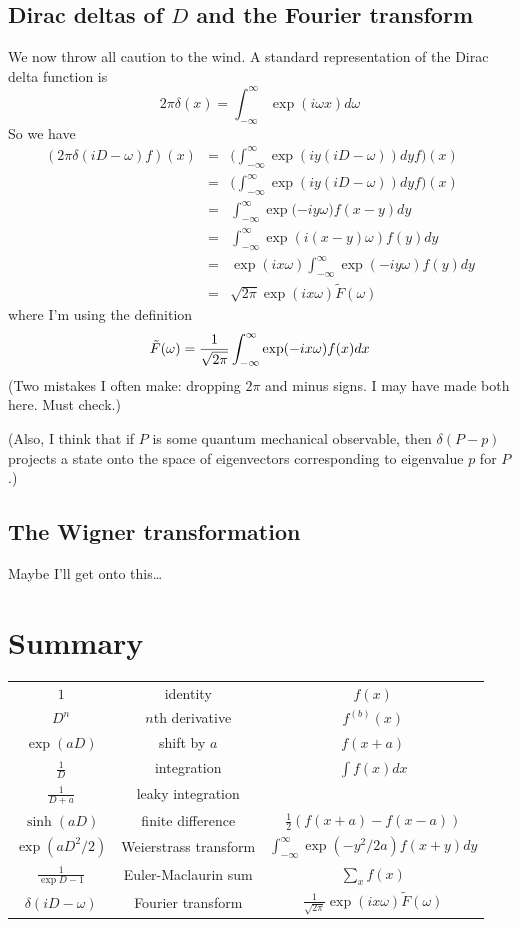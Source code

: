 \documentclass[a4paper]{article}
\theoremstyle{definition}
\begin{document}
\subsection{Dirac deltas of $D$ and the Fourier transform}
We now throw all caution to the wind.
A standard representation of the Dirac delta function is
\[
2\pi\delta(x) = \int_{-\infty}^\infty \exp(i\omega x)d\omega
\]
So we have
\begin{eqnarray*}
(2\pi\delta(iD-\omega)f)(x) & = & \big(\int_{-\infty}^\infty\exp(iy(iD-\omega))dyf\big)(x) \\
& = & \big(\int_{-\infty}^\infty\exp(iy(iD-\omega))dyf\big)(x) \\
& = & \int_{-\infty}^\infty\exp(-iy\omega\big)f(x-y)dy \\
& = & \int_{-\infty}^\infty\exp(i(x-y)\omega)f(y)dy \\
& = & \exp(ix\omega)\int_{-\infty}^\infty\exp(-iy\omega)f(y)dy \\
& = & \sqrt{2\pi}\exp(ix\omega)\tilde{F}(\omega)
\end{eqnarray*}
where I'm using the definition
\[
\tilde{F}(\omega) = \frac{1}{\sqrt{2\pi}}\int_{-\infty}^\infty\exp(-ix\omega)f(x)dx \\
\]
(Two mistakes I often make: dropping $2\pi$ and minus signs.
I may have made both here.
Must check.)

(Also, I think that if $P$ is some quantum mechanical observable, then $\delta(P-p)$ projects a state onto the space of eigenvectors corresponding to eigenvalue $p$ for $P$.)

\subsection{The Wigner transformation}
Maybe I'll get onto this\dots

\section{Summary}
\begin{center}
\tabulinesep=1.2mm
\begin{tabu}{|c|c|c|}
\hline
$1$ & identity & $f(x)$ \\
$D^n$ & $n$th derivative & $f^{(b)}(x)$ \\
$\exp(aD)$ & shift by $a$ & $f(x+a)$ \\
$\frac{1}{D}$ & integration & $\int f(x)dx$ \\
$\frac{1}{D+a}$ & leaky integration & \\
$\sinh(aD)$ & finite difference & $\frac{1}{2}(f(x+a)-f(x-a))$ \\
$\exp(aD^2/2)$ & Weierstrass transform & $\int_{-\infty}^\infty \exp(-y^2/2a) f(x+y)dy$ \\
$\frac{1}{\exp D-1}$ & Euler-Maclaurin sum & $\sum_x f(x)$ \\
$\delta(iD-\omega)$ & Fourier transform & $\frac{1}{\sqrt{2\pi}}\exp(ix\omega)\tilde{F}(\omega)$ \\
\hline
\end{tabu}
\end{center}
\end{document}
